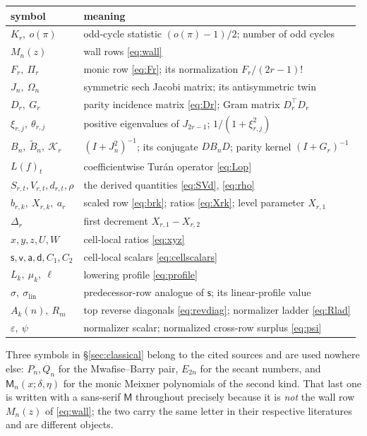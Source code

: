 \documentclass[11pt,a4paper]{article}
\theoremstyle{plain}
\theoremstyle{definition}
\theoremstyle{remark}
\newcommand{\ls}{\mathsf{s}}
\newcommand{\lv}{\mathsf{v}}
\newcommand{\la}{\mathsf{a}}
\newcommand{\ld}{\mathsf{d}}
\begin{document}
\begin{center}
\begin{tabular}{@{}ll@{}}
\toprule
symbol & meaning\\
\midrule
$K_r,\ o(\pi)$ & odd-cycle statistic $(o(\pi)-1)/2$; number of odd cycles\\
$M_n(z)$ & wall rows \eqref{eq:wall}\\
$F_r,\ \Pi_r$ & monic row \eqref{eq:Fr}; its normalization $F_r/(2r-1)!$\\
$J_n,\ \Omega_n$ & symmetric sech Jacobi matrix; its antisymmetric twin\\
$D_r,\ G_r$ & parity incidence matrix \eqref{eq:Dr}; Gram matrix $D_r^\top D_r$\\
$\xi_{r,j},\ \theta_{r,j}$ & positive eigenvalues of $J_{2r-1}$; $1/(1+\xi_{r,j}^2)$\\
$B_n,\ \widetilde B_n,\ \mathcal K_r$ & $(I+J_n^2)^{-1}$; its conjugate $DB_nD$;
   parity kernel $(I+G_r)^{-1}$\\
$L(f)_t$ & coefficientwise Tur\'an operator \eqref{eq:Lop}\\
$S_{r,t},V_{r,t},d_{r,t},\rho$ & the derived quantities \eqref{eq:SVd},
   \eqref{eq:rho}\\
$b_{r,k},\ X_{r,k},\ a_r$ & scaled row \eqref{eq:brk}; ratios \eqref{eq:Xrk};
   level parameter $X_{r,1}$\\
$\Delta_r$ & first decrement $X_{r,1}-X_{r,2}$\\
$x,y,z,U,W$ & cell-local ratios \eqref{eq:xyz}\\
$\ls,\lv,\la,\ld,C_1,C_2$ & cell-local scalars \eqref{eq:cellscalars}\\
$L_k,\ \mu_k,\ \ell$ & lowering profile \eqref{eq:profile}\\
$\sigma,\ \sigma_{\mathrm{lin}}$ & predecessor-row analogue of $\ls$; its linear-profile value\\
$A_k(n),\ R_m$ & top reverse diagonals \eqref{eq:revdiag}; normalizer ladder \eqref{eq:Rlad}\\
$\varepsilon,\ \psi$ & normalizer scalar; normalized cross-row surplus \eqref{eq:psi}\\
\bottomrule
\end{tabular}
\end{center}

Three symbols in \S\ref{sec:classical} belong to the cited sources and are used
nowhere else: $P_n,Q_n$ for the Mwafise--Barry pair, $E_{2n}$ for the secant
numbers, and $\mathsf{M}_n(x;\delta,\eta)$ for the monic Meixner polynomials of
the second kind. That last one is written with a sans-serif $\mathsf{M}$
throughout precisely because it is \emph{not} the wall row $M_n(z)$ of
\eqref{eq:wall}; the two carry the same letter in their respective literatures
and are different objects.
\end{document}

